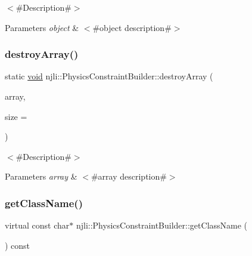 $<$\#\+Description\#$>$


\begin{DoxyParams}{Parameters}
{\em object} & $<$\#object description\#$>$ \\
\hline
\end{DoxyParams}
\mbox{\label{classnjli_1_1_physics_constraint_builder_a2f170c34503a87f175e1f8ba1f7c5066}} 
\subsubsection{\texorpdfstring{destroy\+Array()}{destroyArray()}}
{\footnotesize\ttfamily static \mbox{\hyperlink{_thread_8h_af1e856da2e658414cb2456cb6f7ebc66}{void}} njli\+::\+Physics\+Constraint\+Builder\+::destroy\+Array (\begin{DoxyParamCaption}\item[{\mbox{\hyperlink{classnjli_1_1_physics_constraint_builder}{Physics\+Constraint\+Builder}} $\ast$$\ast$}]{array,  }\item[{const \mbox{\hyperlink{_util_8h_a10e94b422ef0c20dcdec20d31a1f5049}{u32}}}]{size = {} }\end{DoxyParamCaption})\hspace{0.3cm}{\ttfamily [static]}}

$<$\#\+Description\#$>$


\begin{DoxyParams}{Parameters}
{\em array} & $<$\#array description\#$>$ \\
\hline
\end{DoxyParams}
\mbox{\label{classnjli_1_1_physics_constraint_builder_a3f9857e95c8ef12bd9497d647ba3c38b}} 
\subsubsection{\texorpdfstring{get\+Class\+Name()}{getClassName()}}
{\footnotesize\ttfamily virtual const char$\ast$ njli\+::\+Physics\+Constraint\+Builder\+::get\+Class\+Name (\begin{DoxyParamCaption}{ }\end{DoxyParamCaption}) const\hspace{0.3cm}{\ttfamily [virtual]}}

